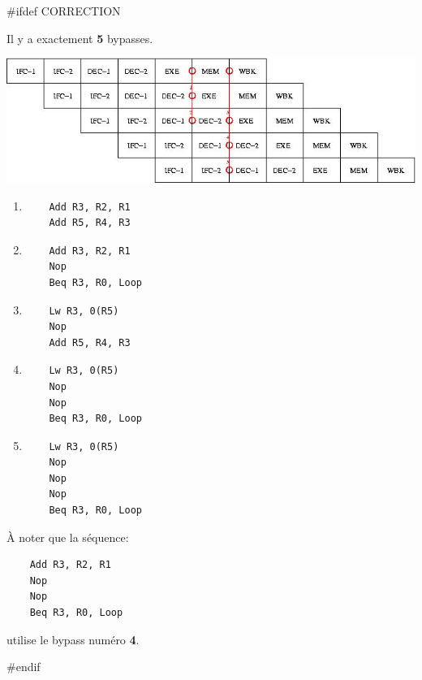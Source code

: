 #ifdef CORRECTION
\begin{correction}

  Il y a exactement \textbf{5} bypasses.

  \begin{center}
    \includegraphics[scale=0.7]{figures/correction-pipeline.jpg}
  \end{center}

  \begin{enumerate}
    \item
      \begin{verbatim}
	Add R3, R2, R1
	Add R5, R4, R3
      \end{verbatim}
    \item
      \begin{verbatim}
	Add R3, R2, R1
	Nop
	Beq R3, R0, Loop
      \end{verbatim}
    \item
      \begin{verbatim}
	Lw R3, 0(R5)
	Nop
	Add R5, R4, R3
      \end{verbatim}
    \item
      \begin{verbatim}
	Lw R3, 0(R5)
	Nop
	Nop
	Beq R3, R0, Loop
      \end{verbatim}
    \item
      \begin{verbatim}
	Lw R3, 0(R5)
	Nop
	Nop
	Nop
	Beq R3, R0, Loop
      \end{verbatim}
  \end{enumerate}

  \`A noter que la s\'equence:

  \begin{verbatim}
    Add R3, R2, R1
    Nop
    Nop
    Beq R3, R0, Loop  
  \end{verbatim}

  utilise le bypass num\'ero \textbf{4}.

\end{correction}
#endif

%
%

